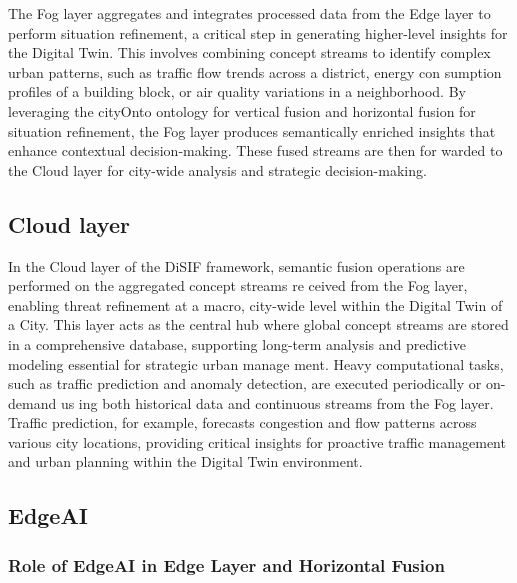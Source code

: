 \documentclass[5p,times]{elsarticle}
\begin{document}
The Fog layer aggregates and integrates processed data from
the Edge layer to perform situation refinement, a critical step
in generating higher-level insights for the Digital Twin. This
involves combining concept streams to identify complex urban
patterns, such as traffic flow trends across a district, energy con
sumption profiles of a building block, or air quality variations
in a neighborhood. By leveraging the cityOnto ontology for
vertical fusion and horizontal fusion for situation refinement, the
Fog layer produces semantically enriched insights that enhance
contextual decision-making. These fused streams are then for
warded to the Cloud layer for city-wide analysis and strategic
decision-making.











\subsection{Cloud layer}

In the Cloud layer of the DiSIF framework, semantic fusion
operations are performed on the aggregated concept streams re
ceived from the Fog layer, enabling threat refinement at a macro,
city-wide level within the Digital Twin of a City. This layer
acts as the central hub where global concept streams are stored
in a comprehensive database, supporting long-term analysis
and predictive modeling essential for strategic urban manage
ment. Heavy computational tasks, such as traffic prediction and
anomaly detection, are executed periodically or on-demand us
ing both historical data and continuous streams from the Fog
layer. Traffic prediction, for example, forecasts congestion and
flow patterns across various city locations, providing critical
insights for proactive traffic management and urban planning
within the Digital Twin environment.

\subsection{EdgeAI}

\subsubsection{Role of EdgeAI in Edge Layer and Horizontal Fusion}
\end{document}
